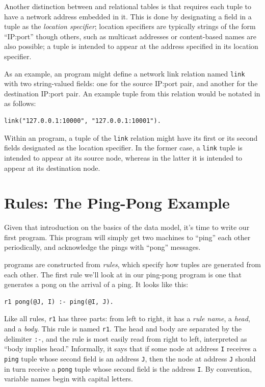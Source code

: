 \documentclass{article}
\begin{document}
Another distinction between \ol and relational tables is that
\ol requires each tuple to have a network address embedded in it.
This is done by designating a field in a tuple as the \emph{location
  specifier}; location specifiers are typically strings of the form
``IP:port'' though others, such as multicast addresses or content-based
names are also possible; a tuple is intended to appear at the
address specified in its location specifier. 

As an example, an \ol program might define a network link relation
named \lstinline$link$ with two string-valued fields: one for the
source IP:port pair, and another for the destination IP:port pair.  An
example tuple from this relation would be notated in \ol as
follows:
\begin{lstlisting}
link("127.0.0.1:10000", "127.0.0.1:10001").
\end{lstlisting}

Within an \ol program, a tuple of the \lstinline$link$ relation
might have its first or its second fields designated as the location
specifier. In the former case, a \lstinline$link$ tuple is intended to
appear at its source node, whereas in the latter it is intended to
appear at its destination node.



\section{\ol Rules: The Ping-Pong Example}
\label{sec:pingPong}
Given that introduction on the basics of the \ol data model, it's
time to write our first \ol program.  This program will simply get
two machines to ``ping'' each other periodically, and acknowledge the
pings with ``pong'' messages.

\ol programs are constructed from {\em rules}, which specify how
tuples are generated from each other.  The first rule we'll look at in
our ping-pong program is one that generates a pong on the arrival of a
ping.  It looks like this:
\begin{lstlisting}
r1 pong(@J, I) :- ping(@I, J).
\end{lstlisting}
Like all \ol rules, \lstinline$r1$ has three parts: from left to
right, it has a {\em rule name}, a {\em head}, and a {\em body}. This
rule is named \lstinline$r1$.  The head and body are separated by the
delimiter \lstinline$:-$, and the rule is most easily read from right
to left, interpreted as ``body implies head.''  Informally, it says
that if some node at address \lstinline$I$ receives a \lstinline$ping$
tuple whose second field is an address \lstinline$J$, then the node at
address \lstinline$J$ should in turn receive a \lstinline$pong$ tuple
whose second field is the address \lstinline$I$.  By convention,
\ol variable names begin with capital letters.
\end{document}
